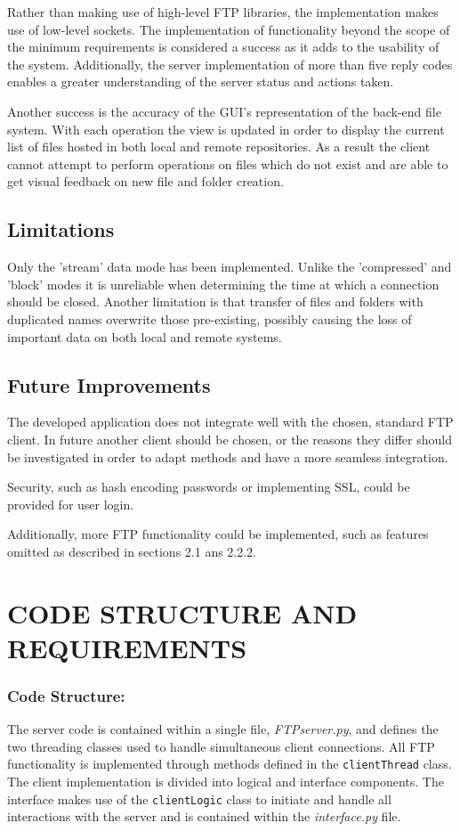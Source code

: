 \documentclass[10pt,twocolumn]{witseiepaper}
\begin{document}
Rather than making use of high-level FTP libraries, the implementation makes use of low-level sockets. The implementation of functionality beyond the scope of the minimum requirements is considered a success as it adds to the usability of the system. Additionally, the server implementation of more than five reply codes enables a greater understanding of the server status and actions taken.

Another success is the accuracy of the GUI's representation of the back-end file system. With each operation the view is updated in order to display the current list of files hosted in both local and remote repositories. As a result the client cannot attempt to perform operations on files which do not exist and are able to get visual feedback on new file and folder creation.

\subsection{Limitations}
Only the 'stream' data mode has been implemented. Unlike the 'compressed' and 'block' modes it is unreliable when determining the time at which a connection should be closed. Another limitation is that transfer of files and folders with duplicated names overwrite those pre-existing, possibly causing the loss of important data on both local and remote systems.

\subsection{Future Improvements}
The developed application does not integrate well with the chosen, standard FTP client. In future another client should be chosen, or the reasons they differ should be investigated in order to adapt methods and have a more seamless integration.

Security, such as hash encoding passwords or implementing SSL, could be provided for user login.

Additionally, more FTP functionality could be implemented, such as features omitted as described in sections 2.1 ans 2.2.2.
\section{CODE STRUCTURE AND REQUIREMENTS}

\subsubsection*{Code Structure: } The server code is contained within a single file, \textit{FTPserver.py}, and defines the two threading classes used to handle simultaneous client connections. All FTP functionality is implemented through methods defined in the \texttt{clientThread} class. The client implementation is divided into logical and interface components. The interface makes use of the \texttt{clientLogic} class to initiate and handle all interactions with the server and is contained within the \textit{interface.py} file.  
 
\end{document}
